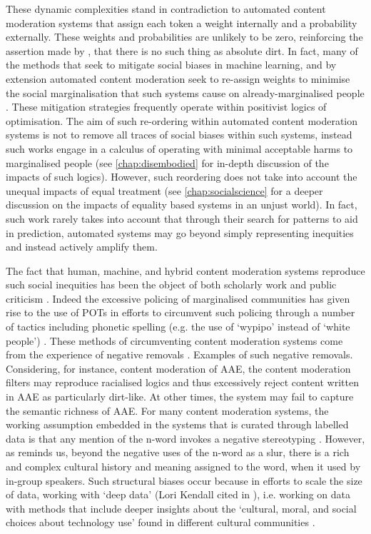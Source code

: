 These dynamic complexities stand in contradiction to automated content moderation systems that assign each token a weight internally and a probability externally. These weights and probabilities are unlikely to be zero, reinforcing the assertion made by \citet{Douglas:1966}, that there is no such thing as absolute dirt. In fact, many of the methods that seek to mitigate social biases in machine learning, and by extension automated content moderation seek to re-assign weights to minimise the social marginalisation that such systems cause on already-marginalised people \cite{Liu:2019}. These mitigation strategies frequently operate within positivist logics of optimisation. The aim of such re-ordering within automated content moderation systems is not to remove all traces of social biases within such systems, instead such works engage in a calculus of operating with minimal acceptable harms to marginalised people (see \autoref{chap:disembodied} for in-depth discussion of the impacts of such logics). However, such reordering does not take into account the unequal impacts of equal treatment (see \autoref{chap:socialscience} for a deeper discussion on the impacts of equality based systems in an unjust world). In fact, such work rarely takes into account that through their search for patterns to aid in prediction, automated systems may go beyond simply representing inequities and instead actively amplify them.\vspace{5mm}

The fact that human, machine, and hybrid content moderation systems reproduce such social inequities has been the object of both scholarly work \cite{Davidson:2019,Sap:2019,Dixon:2018,Gomes:2018} and public criticism \cite{Guynn:2019}. Indeed the excessive policing of marginalised communities has given rise to the use of POTs \cite{Kulynych:2020} in efforts to circumvent such policing through a number of tactics including phonetic spelling (e.g. the use of `wypipo' instead of `white people') \cite{Guynn:2019}. These methods of circumventing content moderation systems come from the experience of negative removals \cite{Guynn:2019}. Examples of such negative removals. Considering, for instance, content moderation of AAE, the content moderation filters may reproduce racialised logics and thus excessively reject content written in AAE as particularly dirt-like. At other times, the system may fail to capture the semantic richness of AAE. For many content moderation systems, the working assumption embedded in the systems  \cite{Davidson:2019} that is curated through labelled data \cite{Sap:2019} is that any mention of the n-word invokes a negative stereotyping \cite{Waseem:2018}. However, as \citet{Rahman:2012} reminds us, beyond the negative uses of the n-word as a slur, there is a rich and complex cultural history and meaning assigned to the word, when it used by in-group speakers. Such structural biases occur because in efforts to scale the size of data, working with `deep data' (Lori Kendall cited in \citet{Brock:2015}), i.e. working on data with methods that include deeper insights about the `cultural, moral, and social choices about technology use' found in different cultural communities \cite{Brock:2015}.


